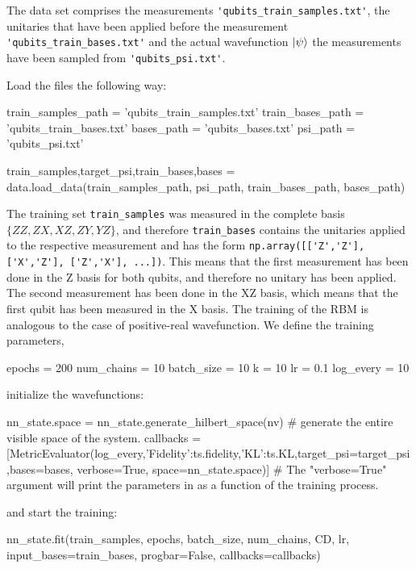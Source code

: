 \documentclass[submission, Phys]{SciPost}
\begin{document}
The data set comprises the measurements \verb|'qubits_train_samples.txt'|, the unitaries that have been applied before the measurement \verb|'qubits_train_bases.txt'| and the actual wavefunction $\ket{\psi}$ the measurements have been sampled from \verb|'qubits_psi.txt'|.

Load the files the following way:

\begin{python}
train_samples_path = 'qubits_train_samples.txt'
train_bases_path   = 'qubits_train_bases.txt'
bases_path         = 'qubits_bases.txt'
psi_path           = 'qubits_psi.txt'

train_samples,target_psi,train_bases,bases = data.load_data(train_samples_path, psi_path, train_bases_path, bases_path)
\end{python}


The training set \verb|train_samples| was measured in the complete basis $\{ZZ, ZX, XZ, ZY, YZ \}$, and therefore \verb|train_bases| contains the unitaries applied to the respective measurement and has the form \verb|np.array([['Z','Z'], ['X','Z'], ['Z','X'], ...])|.
This means that the first measurement has been done in the Z basis for both qubits,
and therefore no unitary has been applied. The second measurement has been done in the XZ basis,
which means that the first qubit has been measured in the X basis. The training of the RBM is analogous to the case of positive-real wavefunction.
We define the training parameters,

\begin{python}
	epochs   = 200
	num_chains = 10
	batch_size = 10
	k     = 10
	lr     = 0.1
	log_every = 10
\end{python}

initialize the wavefunctions:

\begin{python}
nn_state.space = nn_state.generate_hilbert_space(nv) # generate the entire visible space of the system.
callbacks      = [MetricEvaluator(log_every,{'Fidelity':ts.fidelity,'KL':ts.KL},target_psi=target_psi,bases=bases,
                                  verbose=True, space=nn_state.space)]
# The "verbose=True" argument will print the parameters in { } as a function of the training process.
\end{python}

and start the training:

\begin{python}
nn_state.fit(train_samples, epochs, batch_size, num_chains, CD,
       lr, input_bases=train_bases, progbar=False, callbacks=callbacks)
\end{python}
\end{document}

